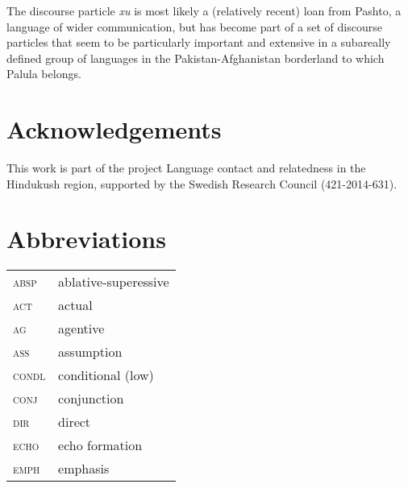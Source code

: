 \documentclass[output=paper]{langsci/langscibook}
\begin{document}
The discourse particle \textit{xu} is most likely a (relatively recent) loan from Pashto, a language of wider communication, but has become part of a set of discourse particles that seem to be particularly important and extensive in a subareally defined group of languages in the Pakistan-Afghanistan borderland to which Palula belongs.

\section*{Acknowledgements}
This work is part of the project Language contact and relatedness in the Hindukush region, supported by the Swedish Research Council (421-2014-631).
 
\section*{Abbreviations}
\begin{tabularx}{.45\textwidth}{lQ}
\textsc{	absp	}	&	ablative-superessive	\\
\textsc{	act	}	&	actual	\\
\textsc{	ag	}	&	agentive	\\
\textsc{	ass	}	&	assumption	\\
\textsc{	condl	}	&	conditional (low)	\\
\textsc{	conj	}	&	conjunction	\\
\textsc{	dir	}	&	direct	\\
\textsc{	echo	}	&	echo formation	\\
\textsc{	emph	}	&	emphasis	\\
\end{tabularx}
\end{document}
